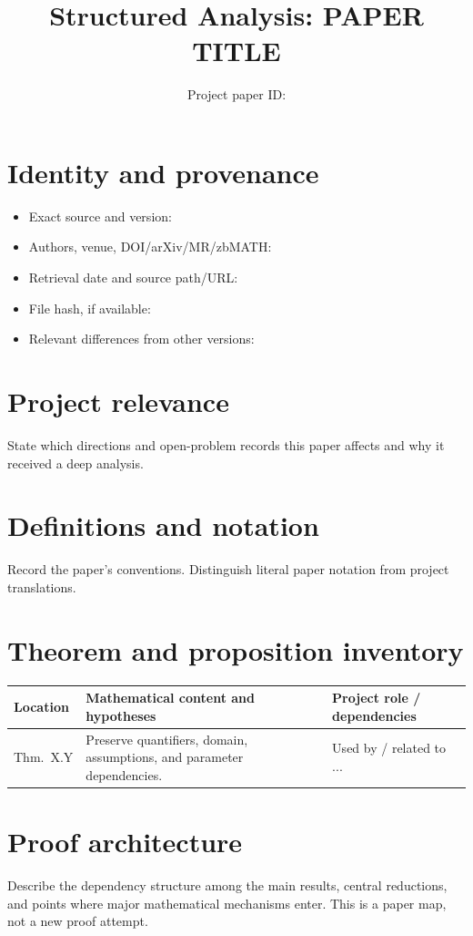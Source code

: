 \documentclass[11pt]{article}
\title{Structured Analysis: PAPER TITLE}
\author{Project paper ID: \texttt{\PaperID}}
\date{\AnalysisDate}
\begin{document}
\maketitle

\section{Identity and provenance}
\begin{itemize}
  \item Exact source and version: 
  \item Authors, venue, DOI/arXiv/MR/zbMATH: 
  \item Retrieval date and source path/URL: 
  \item File hash, if available: 
  \item Relevant differences from other versions: 
\end{itemize}

\section{Project relevance}
State which directions and open-problem records this paper affects and why it received a deep analysis.

\section{Definitions and notation}
Record the paper's conventions. Distinguish literal paper notation from project translations.

\section{Theorem and proposition inventory}
\begin{longtable}{p{}p{}p{}}
\toprule
Location & Mathematical content and hypotheses & Project role / dependencies \\
\midrule
\endhead
Thm.~X.Y & Preserve quantifiers, domain, assumptions, and parameter dependencies. & Used by / related to ... \\
\bottomrule
\end{longtable}

\section{Proof architecture}
Describe the dependency structure among the main results, central reductions, and points where major mathematical mechanisms enter. This is a paper map, not a new proof attempt.
\end{document}
